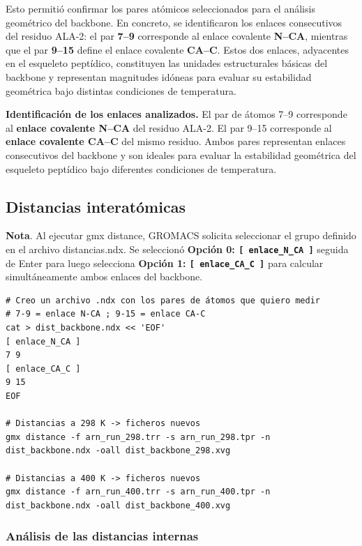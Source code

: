 \documentclass[12pt,a4paper]{article}
\begin{document}
Esto permitió confirmar los pares atómicos seleccionados para el análisis 
geométrico del backbone. En concreto, se identificaron los enlaces consecutivos del 
residuo ALA-2: el par \textbf{7--9} corresponde al enlace covalente \textbf{N--CA}, mientras que el par 
\textbf{9--15} define el enlace covalente \textbf{CA--C}. Estos dos enlaces, adyacentes en el esqueleto 
peptídico, constituyen las unidades estructurales básicas del backbone y representan magnitudes idóneas 
para evaluar su estabilidad geométrica bajo distintas condiciones de temperatura.

\noindent\textbf{Identificación de los enlaces analizados.} 
El par de átomos 7--9 corresponde al \textbf{enlace covalente N--CA} del residuo ALA-2. 
El par 9--15 corresponde al \textbf{enlace covalente CA--C} del mismo residuo. 
Ambos pares representan enlaces consecutivos del backbone y son ideales para evaluar 
la estabilidad geométrica del esqueleto peptídico bajo diferentes condiciones de temperatura.

\subsection{Distancias interatómicas}

\noindent\textbf{Nota}. Al ejecutar gmx distance, GROMACS solicita seleccionar el grupo definido en el archivo distancias.ndx. Se seleccionó \textbf{Opción 0: \texttt{[ enlace\_N\_CA ]}} seguida de Enter para luego selecciona \textbf{Opción 1: \texttt{[ enlace\_CA\_C ]}} para calcular simultáneamente ambos enlaces del backbone.

\begin{lstlisting}[style=bashstyle]
# Creo un archivo .ndx con los pares de átomos que quiero medir
# 7-9 = enlace N-CA ; 9-15 = enlace CA-C
cat > dist_backbone.ndx << 'EOF'
[ enlace_N_CA ]
7 9
[ enlace_CA_C ]
9 15
EOF

# Distancias a 298 K -> ficheros nuevos
gmx distance -f arn_run_298.trr -s arn_run_298.tpr -n dist_backbone.ndx -oall dist_backbone_298.xvg

# Distancias a 400 K -> ficheros nuevos
gmx distance -f arn_run_400.trr -s arn_run_400.tpr -n dist_backbone.ndx -oall dist_backbone_400.xvg
\end{lstlisting}

\subsubsection*{Análisis de las distancias internas}
\end{document}
